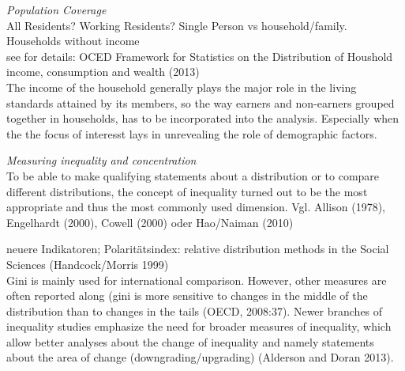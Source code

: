 \documentclass[twoside]{article}\usepackage[]{graphicx}\usepackage[]{color}
\begin{document}
\begin{multicols}{2}





% 

\emph{Population Coverage} \\
All Residents? Working Residents? Single Person vs household/family. Households without income \\
see for details: OCED Framework for Statistics on the Distribution of Houshold income, consumption and wealth (2013) \\

The income of the household generally plays the major role in the living standards attained by its members, so the way earners and non-earners grouped together in households, has to be incorporated into the analysis. Especially when the the focus of interesst lays in unrevealing the role of demographic factors. 


\emph{Measuring inequality and concentration} \\
To be able to make qualifying statements about a distribution or to compare different distributions, the concept of inequality turned out to be the most appropriate and thus the most commonly used dimension. Vgl. Allison (1978), Engelhardt (2000), Cowell (2000) oder Hao/Naiman (2010)

neuere Indikatoren; Polaritätsindex: relative distribution methods in the Social Sciences (Handcock/Morris 1999) \\

Gini is mainly used for international comparison. However, other measures are often reported along (gini is more sensitive to changes in the middle of the distribution than to changes in the tails (OECD, 2008:37). Newer branches of inequality studies emphasize the need for broader measures of inequality, which allow better analyses about the change of inequality and namely statements about the area of change (downgrading/upgrading) (Alderson and Doran 2013). \\


\end{multicols}
\end{document}
